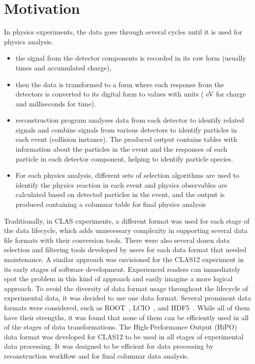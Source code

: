 \section{Motivation}
\label{section-motivation}

In physics experiments, the data goes through several cycles until it is used for physics analysis. 

\begin{itemize}
\item the signal from the detector components is recorded in its raw form (usually times and accumulated charge), 
\item then the data is transformed to a form where each response from the detectors is converted to its digital form to values with units ( eV for charge and milliseconds for time). 
\item reconstruction program analyses data from each detector to identify related signals and combine signals from various detectors to identify particles in each event (collision instance). The produced output contains tables with information about the particles in the event and the responses of each particle in each detector component, helping to identify particle species.
\item For each physics analysis, different sets of selection algorithms are used to identify the physics reaction in each event and physics observables are calculated based on detected particles in the event, and the output is produced containing a columnar table for final physics analysis 
\end{itemize}

Traditionally, in CLAS experiments, a different format was used for each stage of the data lifecycle, which adds unnecessary complexity in supporting several data file formats with their conversion tools. There were also several dozen data selection and filtering tools developed by users for each data format that needed maintenance. A similar approach was envisioned for the CLAS12 experiment in its early stages of software development.
Experienced readers can immediately spot the problem in this kind of approach and easily imagine a more logical approach. 
To avoid the diversity of data format usage throughout the lifecycle of experimental data, it was decided to use one data format.
Several prominent data formats were considered, such as ROOT~\cite{Brun:1997pa}, LCIO~\cite{Aplin:2012kj}, and HDF5~\cite{HDF5:2000pa}. While all of them have their strengths, it was found that 
none of them can be efficiently used in all of the stages of data transformations.
The High-Performance Output (HiPO) data format was developed for CLAS12 to be used in all stages of experimental data processing. It was designed to be efficient for data processing by reconstruction workflow and for final columnar data analysis.